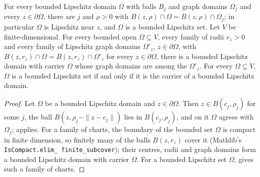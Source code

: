 \begin{theorem}
\label{thm:bounded-lipschitz-sets}
\leanok
{}
For every bounded Lipschitz domain $\Omega$ with balls $B_j$ and graph domains $\Omega_j$ and every
$z \in \partial\Omega$, there are $j$ and $\rho > 0$ with
$B(z, \rho) \cap \Omega = B(z, \rho) \cap \Omega_j$; in particular $\Omega$ is Lipschitz near $z$,
and $\Omega$ is a bounded Lipschitz set. Let $V$ be finite-dimensional. For every bounded open
$\Omega \subseteq V$, every family of radii $r_z > 0$ and every family of Lipschitz graph domains
$\Omega'_z$, $z \in \partial\Omega$, with $B(z, r_z) \cap \Omega = B(z, r_z) \cap \Omega'_z$ for
every $z \in \partial\Omega$, there is a bounded Lipschitz domain with carrier $\Omega$ whose
graph domains are among the $\Omega'_z$. For every $\Omega \subseteq V$, $\Omega$ is a bounded
Lipschitz set if and only if it is the carrier of a bounded Lipschitz domain.
\end{theorem}

\begin{proof}
\leanok
Let $\Omega$ be a bounded Lipschitz domain and $z \in \partial\Omega$. Then $z \in B(c_j, \rho_j)$
for some $j$, the ball $B(z, \rho_j - \|z - c_j\|)$ lies in $B(c_j, \rho_j)$, and on it $\Omega$
agrees with $\Omega_j$;  applies. For a family of charts, the
boundary of the bounded set $\Omega$ is compact in finite dimension, so finitely many of the balls
$B(z, r_z)$ cover it (Mathlib's \texttt{IsCompact.\allowbreak elim\_\allowbreak
finite\_\allowbreak subcover}); their centres, radii and graph domains form a bounded Lipschitz
domain with carrier $\Omega$. For a bounded Lipschitz set $\Omega$,
 gives such a family of charts.
\end{proof}

